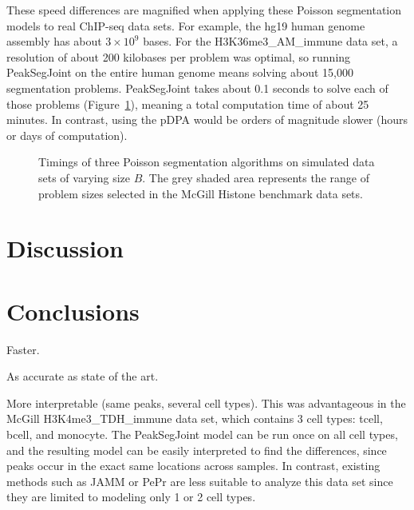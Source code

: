 \documentclass{article} %
\begin{document}
These speed differences are magnified when applying these Poisson
segmentation models to real ChIP-seq data sets. For example, the hg19
human genome assembly has about $3\times 10^9$ bases. For the
H3K36me3\_AM\_immune data set, a resolution of about 200 kilobases per
problem was optimal, so running PeakSegJoint on the entire human
genome means solving about 15,000 segmentation problems. PeakSegJoint
takes about 0.1 seconds to solve each of those problems
(Figure~\ref{fig:timings}), meaning a total computation time of about
25 minutes. In contrast, using the pDPA would be orders of magnitude
slower (hours or days of computation).

\begin{figure}[b!]
  \centering
  
  \vskip -0.5cm
  \caption{Timings of three Poisson segmentation algorithms on
    simulated data sets of varying size $B$. The grey shaded area
    represents the range of problem sizes selected in the McGill
    Histone benchmark data sets. }
  \label{fig:timings}
\end{figure}

\section{Discussion}

\section{Conclusions}

Faster.

As accurate as state of the art.

More interpretable (same peaks, several cell types). This was
advantageous in the McGill H3K4me3\_TDH\_immune data set, which
contains 3 cell types: tcell, bcell, and monocyte. The PeakSegJoint
model can be run once on all cell types, and the resulting model
can be easily interpreted to find the differences, since peaks occur
in the exact same locations across samples. In contrast, existing
methods such as JAMM or PePr are less suitable to analyze this data
set since they are limited to modeling only 1 or 2 cell types.



\end{document}
